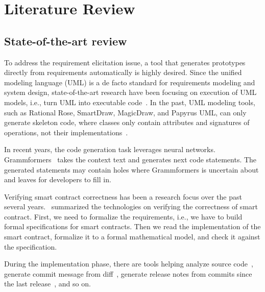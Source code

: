 \chapter{Literature Review}



\section{State-of-the-art review}

To address the requirement elicitation issue, a tool that generates prototypes directly from requirements automatically is highly desired.
Since the unified modeling language (UML) is a de facto standard for requirements modeling and system design,
state-of-the-art research have been focusing on execution of UML models, i.e., turn UML into executable code~\cite{ciccozzi2019execution}.
In the past, UML modeling tools, such as Rational Rose, SmartDraw, MagicDraw, and Papyrus UML, can only generate skeleton code, where classes only contain attributes and signatures of operations, not their implementations~\cite{regep2000using}.

In recent years, the code generation task leverages neural networks. Grammformers~\cite{guo2021learning} takes the context text and generates next code statements. The generated statements may contain holes where Grammformers is uncertain about and leaves for developers to fill in.


Verifying smart contract correctness has been a research focus over the past several years.
\cite{tolmach2021survey}~summarized the technologies on verifying the correctness of smart contract.
First, we need to formalize the requirements, i.e., we have to build formal specifications for smart contracts.
Then we read the implementation of the smart contract, formalize it to a formal mathematical model, and check it against the specification.


During the implementation phase, there are tools helping analyze source code~\cite{morgachev2019detection,huo2016learning,gu2016deep},
generate commit message from diff~\cite{linares2015changescribe,buse2010automatically,huang2020learning},
generate release notes from commits since the last release~\cite{moreno2016arena}, and so on.


